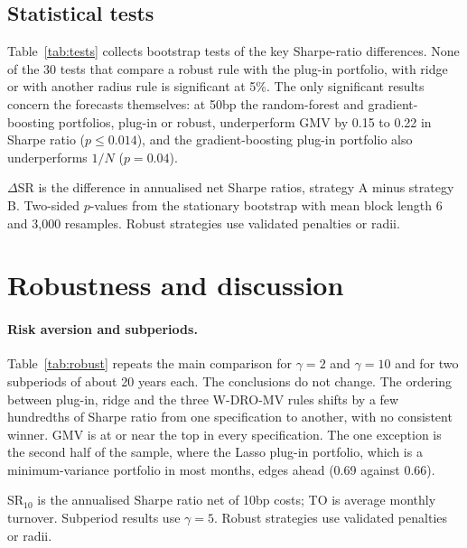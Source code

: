 \documentclass[11pt]{article}
\begin{document}
\subsection{Statistical tests}

Table~\ref{tab:tests} collects bootstrap tests of the key Sharpe-ratio differences. None of the 30 tests that compare a robust rule with the plug-in portfolio, with ridge or with another radius rule is significant at 5\%. The only significant results concern the forecasts themselves: at 50bp the random-forest and gradient-boosting portfolios, plug-in or robust, underperform GMV by 0.15 to 0.22 in Sharpe ratio ($p\le0.014$), and the gradient-boosting plug-in portfolio also underperforms $1/N$ ($p=0.04$).

\begin{table}[!htbp]\centering
\caption{Bootstrap tests of Sharpe-ratio differences}\label{tab:tests}
\small
\begin{minipage}{0.97\linewidth}\footnotesize\smallskip
$\Delta$SR is the difference in annualised net Sharpe ratios, strategy A minus strategy B. Two-sided $p$-values from the stationary bootstrap \citep{politis1994} with mean block length 6 and 3{,}000 resamples. Robust strategies use validated penalties or radii.
\end{minipage}
\end{table}

\section{Robustness and discussion}\label{sec:robust}

\paragraph{Risk aversion and subperiods.} Table~\ref{tab:robust} repeats the main comparison for $\gamma=2$ and $\gamma=10$ and for two subperiods of about 20 years each. The conclusions do not change. The ordering between plug-in, ridge and the three W-DRO-MV rules shifts by a few hundredths of Sharpe ratio from one specification to another, with no consistent winner. GMV is at or near the top in every specification. The one exception is the second half of the sample, where the Lasso plug-in portfolio, which is a minimum-variance portfolio in most months, edges ahead (0.69 against 0.66).

\begin{table}[!htbp]\centering
\caption{Robustness: risk aversion and subperiods}\label{tab:robust}
\footnotesize\setlength{\tabcolsep}{3.5pt}
\begin{minipage}{0.97\linewidth}\footnotesize\smallskip
SR$_{10}$ is the annualised Sharpe ratio net of 10bp costs; TO is average monthly turnover. Subperiod results use $\gamma=5$. Robust strategies use validated penalties or radii.
\end{minipage}
\end{table}
\end{document}

